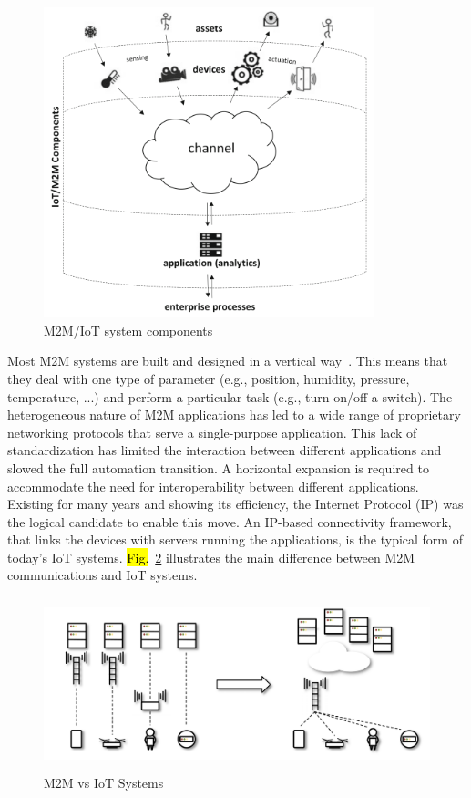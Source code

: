\documentclass[]{IEEEtran}
\begin{document}
\begin{figure}
\centerline{\includegraphics[width=\linewidth,height=9cm]{Pictures/IoT Components.png}}
\caption{M2M/IoT system components~\cite{herrero_fundamentals_2021}}
\label{fig:IoT_components}
\end{figure}
Most M2M systems are built and designed in a vertical way~\cite{alam2013evolution}.
This means that they deal with one type of parameter (e.g., position, humidity, pressure, temperature, ...) and perform a particular task (e.g., turn on/off a switch).
The heterogeneous nature of M2M applications has led to a wide range of proprietary networking protocols that serve a single-purpose application.
This lack of standardization has limited the interaction between different applications and slowed the full automation transition.
A horizontal expansion is required to accommodate the need for interoperability between different applications.
Existing for many years and showing its efficiency, the Internet Protocol (IP) was the logical candidate to enable this move.
An IP-based connectivity framework, that links the devices with servers running the applications, is the typical form of today's IoT systems.
\hl{Fig.}~\ref{fig:M2M_vs_IoT} illustrates the main difference between M2M communications and IoT systems.
\begin{figure}
\centerline{\includegraphics[width=\linewidth,height=5cm]{Pictures/M2M to IoT.png}}
\caption{M2M vs IoT Systems~\cite{liberg_cellular_2019}}
\label{fig:M2M_vs_IoT}
\end{figure}
\end{document}
